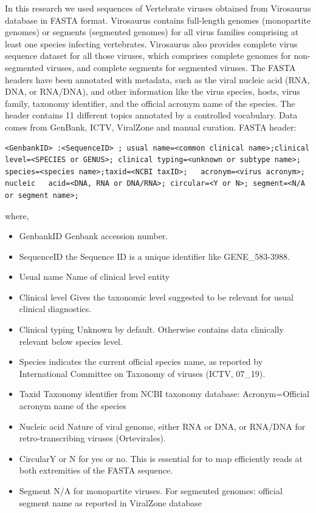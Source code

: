 In this research we used sequences of Vertebrate viruses obtained from Virosaurus database in FASTA format. Virosaurus contains full-length genomes (monopartite genomes) or segments (segmented genomes) for all virus families comprising at least one species infecting vertebrates.  Virosaurus also provides complete virus sequence dataset for all those viruses, which comprises complete genomes for non-segmented viruses, and complete segments for segmented viruses. The FASTA headers have been annotated with metadata, such as the viral nucleic acid (RNA, DNA, or RNA/DNA), and other information like the virus species, hosts, virus family, taxonomy identifier, and the official acronym name of the species.  The header contains 11 different topics annotated by a controlled vocabulary. Data comes from GenBank, ICTV, ViralZone and manual curation. 
FASTA header: 
\begin{lstlisting} 
<GenbankID> :<SequenceID> ; usual name=<common clinical name>;clinical 	level=<SPECIES or GENUS>; clinical typing=<unknown or subtype name>; 	species=<species name>;taxid=<NCBI taxID>;   acronym=<virus acronym>; nucleic 	acid=<DNA, RNA or DNA/RNA>; circular=<Y or N>; segment=<N/A or segment name>;
\end{lstlisting}
where, 
\begin{itemize}
\item{GenbankID}  Genbank accession number. 
\item{SequenceID} the Sequence ID is a unique identifier like GENE\_583-3988. 
\item{Usual name} Name of clinical level entity 
\item{Clinical level} Gives the taxonomic level suggested to be relevant for usual clinical diagnostics. 
\item{Clinical typing} Unknown by default. Otherwise contains data clinically relevant below species level. 
\item{Species} indicates the current official species name, as reported by International Committee on Taxonomy of viruses (ICTV, 07\_19). 
\item{Taxid} Taxonomy identifier from NCBI taxonomy database: 
Acronym=Official acronym name of the species 
\item{Nucleic acid} Nature of viral genome, either RNA or DNA, or RNA/DNA for retro-transcribing viruses (Ortevirales). 
\item{Circular}Y or N for yes or no. This is essential for to map efficiently reads at both extremities of the FASTA sequence. 
\item{Segment} N/A for monopartite viruses. For segmented genomes: official segment name as reported in ViralZone database
\end{itemize}
 
